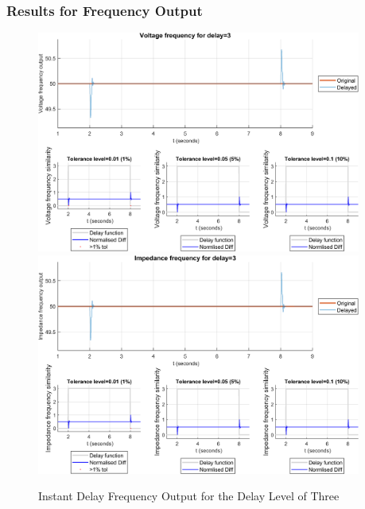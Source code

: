 \subsubsection{Results for Frequency Output}


\begin{figure}
    \caption{Instant Delay Frequency Output for the Delay Level of Three}
    \includegraphics[width=0.95\textwidth]{PMUsim-figures/DelayOf_3/Instant_vFrequency.png}    
    \label{fig:PMUsim_Three_vFrequency}
    \includegraphics[width=0.95\textwidth]{PMUsim-figures/DelayOf_3/Instant_iFrequency.png}    
    \label{fig:PMUsim_Three_Frequency}
        \begin{small}
     \end{small}
\end{figure}


